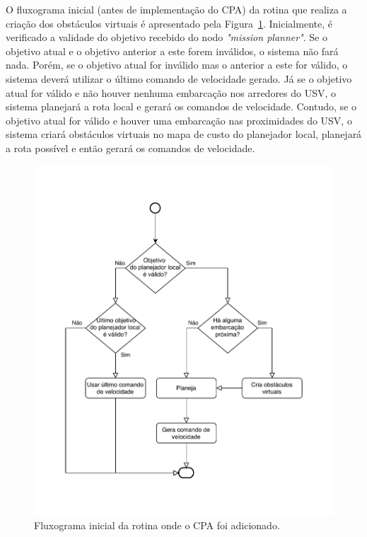     O fluxograma inicial (antes de implementação do CPA) da rotina que realiza a criação dos obstáculos virtuais é apresentado pela Figura~\ref{fig:chap4_fluxograma_inicial}. Inicialmente, é verificado a validade do objetivo recebido do nodo \textit{"mission planner"}. Se o objetivo atual e o objetivo anterior a este forem inválidos, o sistema não fará nada. Porém, se o objetivo atual for inválido mas o anterior a este for válido, o sistema deverá utilizar o último comando de velocidade gerado. 
    Já se o objetivo atual for válido e não houver nenhuma embarcação nos arredores do USV, o sistema planejará a rota local e gerará os comandos de velocidade. Contudo, se o objetivo atual for válido e houver uma embarcação nas proximidades do USV, o sistema criará obstáculos virtuais no mapa de custo do planejador local, planejará a rota possível e então gerará os comandos de velocidade.
    
    \begin{figure}
        \centering
        \includegraphics{fig/chap4/find_best_path_diagram_no_cpa.pdf}
        \caption{Fluxograma inicial da rotina onde o CPA foi adicionado.}
        \label{fig:chap4_fluxograma_inicial}
    \end{figure}
    
